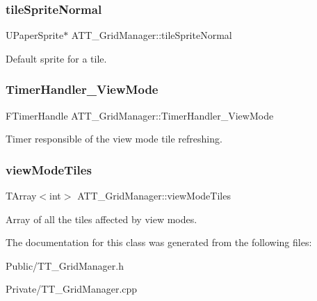 \mbox{\label{class_a_t_t___grid_manager_a2d63415b034d3f4955f73796a51f7155}} 
\subsubsection{\texorpdfstring{tileSpriteNormal}{tileSpriteNormal}}
{\footnotesize\ttfamily U\+Paper\+Sprite$\ast$ A\+T\+T\+\_\+\+Grid\+Manager\+::tile\+Sprite\+Normal\hspace{0.3cm}{\ttfamily [protected]}}



Default sprite for a tile. 

\mbox{\label{class_a_t_t___grid_manager_ad1283266d72303c6d790bbec2f0277d1}} 
\subsubsection{\texorpdfstring{TimerHandler\_ViewMode}{TimerHandler\_ViewMode}}
{\footnotesize\ttfamily F\+Timer\+Handle A\+T\+T\+\_\+\+Grid\+Manager\+::\+Timer\+Handler\+\_\+\+View\+Mode\hspace{0.3cm}{\ttfamily [protected]}}



Timer responsible of the view mode tile refreshing. 

\mbox{\label{class_a_t_t___grid_manager_af541d9efe0df837396a4ffafcebd6205}} 
\subsubsection{\texorpdfstring{viewModeTiles}{viewModeTiles}}
{\footnotesize\ttfamily T\+Array$<$int$>$ A\+T\+T\+\_\+\+Grid\+Manager\+::view\+Mode\+Tiles\hspace{0.3cm}{\ttfamily [protected]}}



Array of all the tiles affected by view modes. 



The documentation for this class was generated from the following files\+:\begin{DoxyCompactItemize}
\item 
Public/T\+T\+\_\+\+Grid\+Manager.\+h\item 
Private/T\+T\+\_\+\+Grid\+Manager.\+cpp\end{DoxyCompactItemize}
